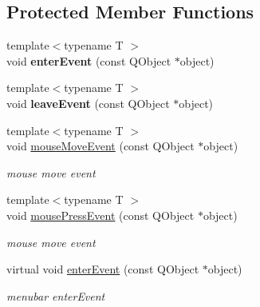 \subsection*{Protected Member Functions}
\begin{DoxyCompactItemize}
\item 
\mbox{\label{class_menu_bar_data_v1_a3b4e34e81d02492fe783814968a2c571}} 
{\footnotesize template$<$typename T $>$ }\\void {\bfseries enter\+Event} (const Q\+Object $\ast$object)
\item 
\mbox{\label{class_menu_bar_data_v1_aac4cea09a632540fc5a4167014df78e7}} 
{\footnotesize template$<$typename T $>$ }\\void {\bfseries leave\+Event} (const Q\+Object $\ast$object)
\item 
\mbox{\label{class_menu_bar_data_v1_aa0e2853ad24bd0a415c54959216d4bdc}} 
{\footnotesize template$<$typename T $>$ }\\void \hyperlink{class_menu_bar_data_v1_aa0e2853ad24bd0a415c54959216d4bdc}{mouse\+Move\+Event} (const Q\+Object $\ast$object)
\begin{DoxyCompactList}\small\item\em mouse move event \end{DoxyCompactList}\item 
\mbox{\label{class_menu_bar_data_v1_a082da0054f7ad4492baa1a8099aa5681}} 
{\footnotesize template$<$typename T $>$ }\\void \hyperlink{class_menu_bar_data_v1_a082da0054f7ad4492baa1a8099aa5681}{mouse\+Press\+Event} (const Q\+Object $\ast$object)
\begin{DoxyCompactList}\small\item\em mouse move event \end{DoxyCompactList}\item 
\mbox{\label{class_menu_bar_data_v1_a0cf015840318856fa43ca02a5fbdc893}} 
virtual void \hyperlink{class_menu_bar_data_v1_a0cf015840318856fa43ca02a5fbdc893}{enter\+Event} (const Q\+Object $\ast$object)
\begin{DoxyCompactList}\small\item\em menubar enter\+Event \end{DoxyCompactList}\item 

\end{DoxyCompactItemize}
